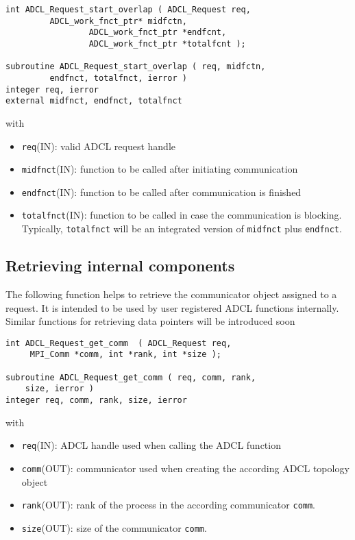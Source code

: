 \begin{verbatim}
int ADCL_Request_start_overlap ( ADCL_Request req, 
         ADCL_work_fnct_ptr* midfctn,
				 ADCL_work_fnct_ptr *endfcnt, 
				 ADCL_work_fnct_ptr *totalfcnt );

subroutine ADCL_Request_start_overlap ( req, midfctn,
         endfnct, totalfnct, ierror )
integer req, ierror
external midfnct, endfnct, totalfnct
\end{verbatim}
with
\begin{itemize}
\item {\tt req}(IN): valid ADCL request handle
\item {\tt midfnct}(IN): function to be called after initiating communication
\item {\tt endfnct}(IN): function to be called after communication is finished
\item {\tt totalfnct}(IN): function to be called in case the communication is blocking. Typically, {\tt totalfnct} will be an integrated version of {\tt midfnct} plus {\tt endfnct}.
\end{itemize}
\hspace{1cm}

\subsection{Retrieving internal components}

The following function helps to retrieve the communicator object assigned to a request. It is intended to be used by user registered ADCL functions internally. Similar functions for retrieving data pointers will be introduced soon

\begin{verbatim}
int ADCL_Request_get_comm  ( ADCL_Request req, 
     MPI_Comm *comm, int *rank, int *size );
     
subroutine ADCL_Request_get_comm ( req, comm, rank,
    size, ierror )
integer req, comm, rank, size, ierror     
\end{verbatim}
with
\begin{itemize}
\item {\tt req}(IN): ADCL handle used when calling the ADCL function
\item {\tt comm}(OUT): communicator used when creating the according ADCL topology object
\item {\tt rank}(OUT): rank of the process in the according communicator {\tt comm}.
\item {\tt size}(OUT): size of the communicator {\tt comm}.
\end{itemize}

